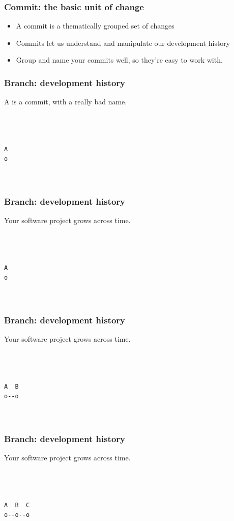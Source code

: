 \documentclass[unknownkeysallowed]{beamer}
\begin{document}
\begin{frame}
	\frametitle{Commit: the basic unit of change}
        \vspace{1cm} %
	\begin{itemize}
	    \item{A commit is a thematically grouped set of changes}
        \vspace{0.5cm} %
	    \item{Commits let us understand and manipulate our development history}
        \vspace{0.5cm} %
	    \item{Group and name your commits well, so they're easy to work with.}
	\end{itemize}
\end{frame}

\begin{frame}[fragile]
	\frametitle{Branch: development history}
	A is a commit, with a really bad name.

\begin{verbatim}



A  
o



\end{verbatim}
\end{frame}

\begin{frame}[fragile]
	\frametitle{Branch: development history}
	Your software project grows across time.
\begin{verbatim}



A  
o



\end{verbatim}
\end{frame}

\begin{frame}[fragile]
	\frametitle{Branch: development history}
	    Your software project grows across time.
\begin{verbatim}



A  B
o--o
   


\end{verbatim}
\end{frame}

\begin{frame}[fragile]
	\frametitle{Branch: development history}
	    Your software project grows across time.
\begin{verbatim}



A  B  C
o--o--o
      
     
    
\end{verbatim}
\end{frame}
\end{document}
